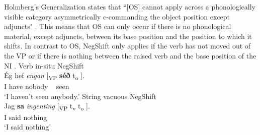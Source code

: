 \documentclass[12pt, letterpaper]{article}
\begin{document}
Holmberg's Generalization states that ``[OS] cannot apply across a phonologically visible category asymmetrically c-commanding the object position except adjuncts" \citep[15]{holmbergRemarksHolmbergGeneralization1999}. This means that OS can only occur if there is no phonological material, except adjuncts, between its base position and the position to which it shifts. In contrast to OS, NegShift only applies if the verb has not moved out of the VP or if there is nothing between the raised verb and the base position of the NI \citep{foxCyclicLinearizationSyntactic2005,engelsScandinavianNegativeIndefinites2012}. 
	\ea 
		\ea Verb in-situ NegShift\\
		{\gll Ég hef \textit{engan} [\textsubscript{VP} \textbf{séð} t\textsubscript{o}	].\\
			I have nobody ~ seen\\}
		\glt `I haven't seen anybody.'
		\ex String vacuous NegShift\\
		{\gll Jag \textbf{sa} \textit{ingenting} [\textsubscript{VP} t\textsubscript{v}  t\textsubscript{o}  ].\\
			I said nothing\\}
		\glt `I said nothing'
		\z
	\z 
\end{document}
